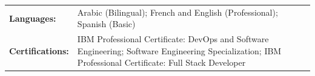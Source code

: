 \renewcommand{\arraystretch}{1.1}

\begin{tabular}{p{} p{}}
\textbf{Languages:} & Arabic (Bilingual); French and English (Professional); Spanish (Basic) \\
\textbf{Certifications:} & IBM Professional Certificate: DevOps and Software Engineering; Software Engineering Specialization; IBM Professional Certificate: Full Stack Developer \\
\end{tabular}
